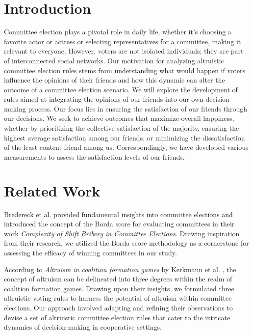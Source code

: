 \documentclass{article}
\begin{document}
\tableofcontents %

\newpage %

\section{Introduction}
Committee election plays a pivotal role in daily life, whether it's choosing a favorite actor or actress or selecting representatives for a committee, making it relevant to everyone. However, voters are not isolated individuals; they are part of interconnected social networks. Our motivation for analyzing altruistic committee election rules stems from understanding what would happen if voters influence the opinions of their friends and how this dynamic can alter the outcome of a committee election scenario. We will explore the development of rules aimed at integrating the opinions of our friends into our own decision-making process. Our focus lies in ensuring the satisfaction of our friends through our decisions. We seek to achieve outcomes that maximize overall happiness, whether by prioritizing the collective satisfaction of the majority, ensuring the highest average satisfaction among our friends, or minimizing the dissatisfaction of the least content friend among us. Correspondingly, we have developed various measurements to assess the satisfaction levels of our friends. 

\section{Related Work}
Bredereck et al. \cite{Bredereck2018} provided fundamental insights into committee elections and introduced the concept of the Borda score for evaluating committees in their work \textit{Complexity of Shift Bribery in Committee Elections}. Drawing inspiration from their research, we utilized the Borda score methodology as a cornerstone for assessing the efficacy of winning committees in our study.

According to \textit{Altruism in coalition formation games} by Kerkmann et al. \cite{Kerkmann2023}, the concept of altruism can be delineated into three degrees within the realm of coalition formation games. Drawing upon their insights, we formulated three altruistic voting rules to harness the potential of altruism within committee elections. Our approach involved adapting and refining their observations to devise a set of altruistic committee election rules that cater to the intricate dynamics of decision-making in cooperative settings.
\end{document}
